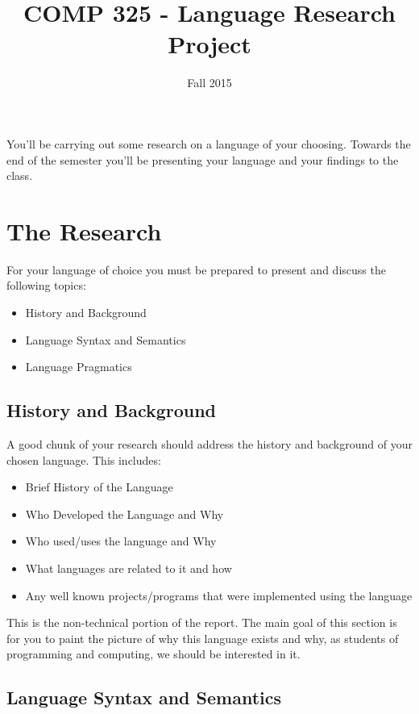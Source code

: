 \documentclass[10pt]{article}
\title{COMP 325 - Language Research Project}
\author{  }
\date{Fall 2015}
\begin{document}
\maketitle

You'll be carrying out some research on a language of your choosing.  Towards the end of the semester you'll be presenting your language and your findings to the class.

\section{The Research}

For your language of choice you must be prepared to present and discuss the following topics:
\begin{itemize}
\item History and Background
\item Language Syntax and Semantics 
\item Language Pragmatics
\end{itemize}



\subsection{History and Background}

A good chunk of your research should address the history and background of your chosen language.  This includes:
\begin{itemize}
\item Brief History of the Language
\item Who Developed the Language and Why
\item Who used/uses the language and Why
\item What languages are related to it and how
\item Any well known projects/programs that were implemented using the language
\end{itemize}
This is the non-technical portion of the report.  The main goal of this section is for you to paint the picture of why this language exists and why, as students of programming and computing, we should be interested in it.  

\subsection{Language Syntax and Semantics}
\end{document}

